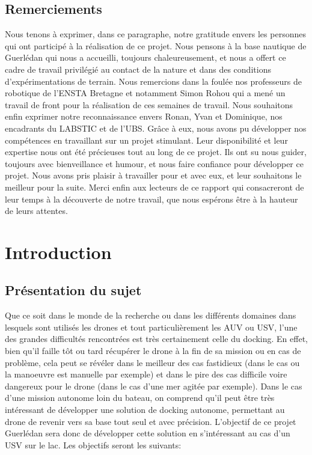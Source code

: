 \documentclass[12pt]{report}
\begin{document}


\tableofcontents

\newpage
\section*{\centering Remerciements}
Nous tenons à exprimer, dans ce paragraphe, notre gratitude envers les personnes qui ont participé à la réalisation de ce projet. 
Nous pensons à la base nautique de Guerlédan qui nous a accueilli, toujours chaleureusement, et nous a offert ce cadre de travail privilégié au contact de la nature et dans des conditions d'expérimentations de terrain.
Nous remercions dans la foulée nos professeurs de robotique de l'ENSTA Bretagne et notamment Simon Rohou qui a mené un travail de front pour la réalisation de ces semaines de travail.
Nous souhaitons enfin exprimer notre reconnaissance envers Ronan, Yvan et Dominique, nos encadrants du LABSTIC et de l'UBS. Grâce à eux, nous avons pu développer nos compétences en travaillant sur 
un projet stimulant. Leur disponibilité et leur expertise nous ont été précieuses tout au long de ce projet. Ils ont su nous guider, toujours avec bienveillance et humour, et nous faire confiance pour développer ce projet.
Nous avons pris plaisir à travailler pour et avec eux, et leur souhaitons le meilleur pour la suite. Merci enfin aux lecteurs de ce rapport qui consacreront de leur temps à la découverte de notre travail, que nous espérons être à la hauteur de leurs attentes.

\chapter{Introduction}

\section{Présentation du sujet}

Que ce soit dans le monde de la recherche ou dans les différents domaines dans lesquels sont utilisés les drones et tout particulièrement les AUV ou USV, l'une des grandes difficultés rencontrées est très certainement celle du docking. En effet, bien qu'il faille tôt ou tard récupérer le drone à la fin de sa mission ou en cas de problème, cela peut se révéler dans le meilleur des cas fastidieux (dans le cas ou la manoeuvre est manuelle par exemple) et dans le pire des cas difficile voire dangereux pour le drone (dans le cas d'une mer agitée par exemple). Dans le cas d'une mission autonome loin du bateau, on comprend qu'il peut être très intéressant de développer une solution de docking autonome, permettant au drone de revenir vers sa base tout seul et avec précision. L'objectif de ce projet Guerlédan sera donc de développer cette solution en s'intéressant au cas d'un USV sur le lac. Les objectifs seront les suivants:
\end{document}
